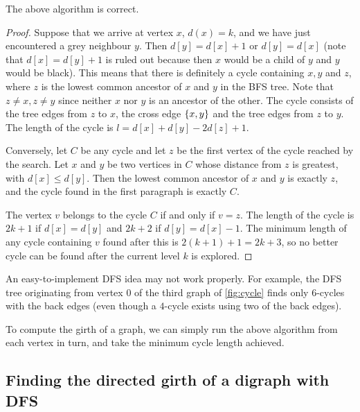 \begin{Theorem}
\label{thm:BFS-cycle} 
The above algorithm is correct.
\end{Theorem}

\begin{proof}
Suppose that we arrive at vertex $x$, $d(x) = k$, and we have just
encountered a grey neighbour $y$. Then $d[y] = d[x] + 1$ or $d[y] = d[x]$
(note that $d[x] = d[y] + 1$ is ruled out because then $x$ would be a
child of $y$ and $y$ would be black). This means that there is definitely
a cycle containing $x, y$ and $z$, where $z$ is the lowest common ancestor
of $x$ and $y$ in the BFS tree. Note that $z\neq x, z\neq y$ since neither
$x$ nor $y$ is an ancestor of the other. The cycle consists of the tree
edges from $z$ to $x$, the cross edge $\mbox{$\{x,y\}$}$ and the tree edges
from $z$ to $y$. The length of the cycle is $l=d[x] + d[y] - 2 d[z] + 1$.

Conversely, let $C$ be any cycle and let $z$ be the first vertex of
the cycle reached by the search. Let $x$ and $y$ be two vertices in $C$
whose distance  from $z$ is greatest, with $d[x] \leq d[y]$. Then the
lowest common ancestor of  $x$ and $y$ is exactly $z$, and the cycle
found in the first paragraph is exactly $C$.

The vertex $v$ belongs to the cycle $C$ if and only if $v = z$. The
length of the cycle is $2k+1$ if $d[x] = d[y]$ and $2k+2$ if $d[y] =
d[x] - 1$. The minimum length of any cycle containing $v$ found after
this is $2(k+1) + 1 = 2k+3$, so no better cycle can be found after the
current level $k$ is explored.
\end{proof}

\begin{note}
An easy-to-implement DFS idea may not work properly. For example,
the DFS tree originating from vertex $0$ of the third graph of
\cref{fig:cycle} finds only $6$-cycles with the back edges (even
though a $4$-cycle exists using two of the back edges).
\end{note}

To compute the girth of a graph, we can simply run the above algorithm
from each vertex in turn, and take the minimum cycle length achieved.

\subsection{Finding the directed girth of a digraph with DFS}



